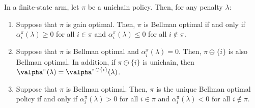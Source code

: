 \begin{lem}
    \label{ch:cpt:lem:unicity_binary}
    In a finite-state arm, let $\pi$ be a unichain policy. Then, for any penalty $\lambda$:
    \begin{enumerate}[label=(\roman*)]
        \item \label{it:binary_opt1} Suppose that $\pi$ is gain optimal. Then, $\pi$ is Bellman optimal if and only if $\alpha^\pi_i(\lambda)\ge0$ for all $i\in\pi$ and $\alpha^\pi_i(\lambda)\le0$ for all $i\notin\pi$.
        \item \label{it:binary_optX} Suppose that $\pi$ is Bellman optimal and $\alpha^\pi_i(\lambda)=0$. Then, $\pi\ominus\{i\}$ is also Bellman optimal. In addition, if $\pi\ominus\{i\}$ is unichain, then $\valpha^\pi(\lambda)=\valpha^{\pi\ominus\{i\}}(\lambda)$.
        \item \label{it:binary_opt2} Suppose that $\pi$ is Bellman optimal. Then, $\pi$ is the unique Bellman optimal policy if and only if $\alpha^\pi_i(\lambda)>0$ for all $i\in\pi$ and $\alpha^\pi_i(\lambda)<0$ for all $i\notin\pi$.
    \end{enumerate}
\end{lem}
